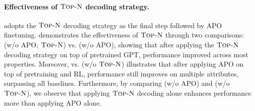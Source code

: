 \paragraph{Effectiveness of $\textsc{Top-N}$ decoding strategy.} \algname adopts the $\textsc{Top-N}$ decoding strategy as the final step followed by APO finetuning.  demonstrates the effectiveness of $\textsc{Top-N}$ through two comparisons: \algname (w/o APO, $\textsc{Top-N}$) vs. \algname (w/o APO), showing that after applying the $\textsc{Top-N}$ decoding strategy on top of pretrained GPT, performance improved across most properties.
Moreover, \algname vs. \algname (w/o $\textsc{Top-N}$) illustrates that after applying APO on top of pretraining and RL, performance still improves on multiple attributes, surpassing all baselines.
Furthermore, by comparing \algname (w/o APO) and \algname (w/o $\textsc{Top-N}$), we observe that applying $\textsc{Top-N}$ decoding alone enhances performance more than applying APO alone.





